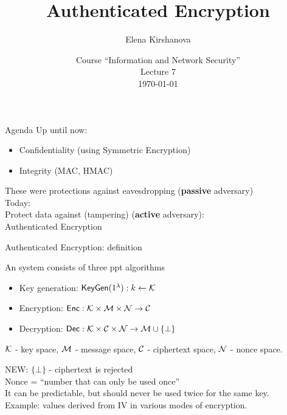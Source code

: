 \documentclass[usenames,dvipsnames, 9pt]{beamer}
\author{Elena Kirshanova \\ [10pt]
}
\title{\Huge Authenticated Encryption}
\date{ Course ``Information and Network Security'' \\ 	
	Lecture 7 \\ \today }
\begin{document}
	
\begin{frame}
	\titlepage
\end{frame}

\begin{frame}{Agenda}
	\Large 
	Up until now: 
	\begin{itemize}
		\item Confidentiality (using Symmetric Encryption)
		\item Integrity (MAC, HMAC)
	\end{itemize}
	\vspace{20pt}
	These were protections against {\color{Orange} eavesdropping (\textbf{passive} adversary)}\\
	\pause 
	\vspace{20pt}
	Today: \\
	Protect data against {\color{Orange} (tampering) (\textbf{active} adversary)}:\\
	\LARGE Authenticated Encryption

\end{frame}

\begin{frame}{Authenticated Encryption: definition}
\Large

An {\color{Orange}{Authenticated Encryption (AE)}} system consists of three ppt algorithms
\begin{itemize}
	\itemsep 10pt
	\item Key generation: $\textsf{KeyGen}(1^\lambda): k \leftarrow \mathcal{K}$
	\item Encryption: $\textsf{Enc}: \mathcal{K} \times \mathcal{M} \times \mathcal{N} \rightarrow \mathcal{C}$
	\item Decryption:  $\textsf{Dec}: \mathcal{K} \times \mathcal{C}  \times \mathcal{N} \rightarrow \mathcal{M} \cup \{\bot\}$
\end{itemize}
\vspace{15pt}
$\mathcal{K}$ - key space, $\mathcal{M}$ - message space, $\mathcal{C}$ - ciphertext space, $\mathcal{N}$ - {\color{Orange} nonce} space. \\[10pt]
\pause

NEW: $\{\bot\}$ - ciphertext is rejected \\


\pause
{\color{Orange} Nonce} = ``number that can only be used once'' \\
It can be predictable, but should {\color{Orange} never be used  twice} for the same key. \\
Example: values derived from IV in various  modes of encryption. 

\end{frame}
\end{document}
